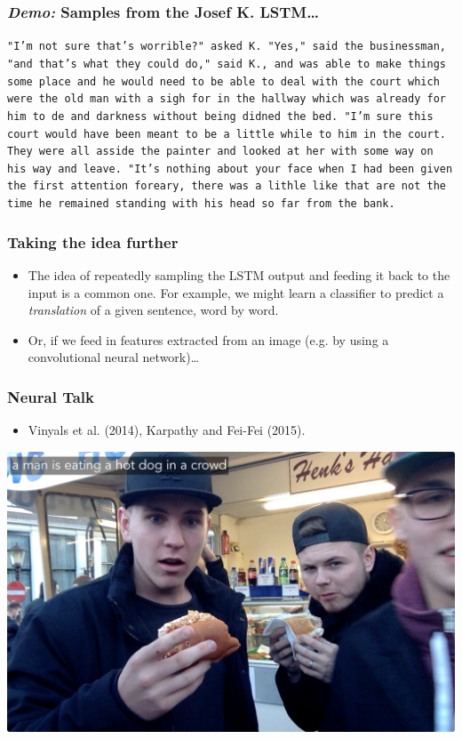 \documentclass{beamer}
\begin{document}
\begin{frame}
	\frametitle{\emph{Demo:} Samples from the Josef K. LSTM\dots}
	{\tt "I'm not sure that's
worrible?" asked K.  "Yes," said the businessman, "and that's what they could do," said K., and was able to make things some place and he would need to be able to deal with the court which were the old man with a sigh for in the hallway which was already for him to de and darkness without being didned the bed.  "I'm sure this court would have been meant to be a little while to him in the court.  They were all asside the painter and looked at her with some way on his way and leave.  "It's nothing about your face when I had been given the first attention foreary, there was a lithle like that are not the time he remained standing with his head so far from the bank.}
\end{frame}

\begin{frame}
	\frametitle{Taking the idea further}
	\begin{itemize}
		\item The idea of repeatedly sampling the LSTM output and feeding it back to the input is a common one. For example, we might learn a classifier to predict a \emph{translation} of a given sentence, word by word.
		\vfill
		\item Or, if we feed in features extracted from an image (e.g. by using a convolutional neural network)\dots
	\end{itemize}
\end{frame}

\begin{frame}
	\frametitle{Neural Talk}
	\begin{itemize}
		\item Vinyals et al. (2014), Karpathy and Fei-Fei (2015).
	\end{itemize}
	\centering
	\includegraphics[width=0.8\linewidth]{neural_talk.jpg}
\end{frame}
\end{document}
